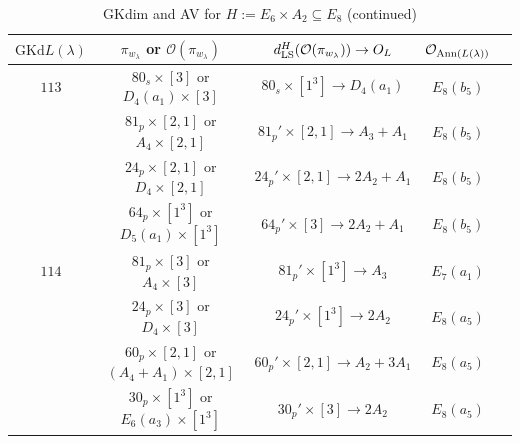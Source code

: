 \documentclass[reqno,12pt]{amsart}
\numberwithin{equation}{section}
\theoremstyle{plain}
\theoremstyle{definition}
\newcommand{\lam}{\lambda}
\renewcommand{\subset}{\subseteq}
\begin{document}
\begin{table}[htbp]\caption{GKdim and AV for $H:=E_6 \times A_2 \subset E_8$ (continued)}
	\label{tabe6a2-2}
	\centering
	\renewcommand{\arraystretch}{1.5}
	\setlength\tabcolsep{5pt}
	
	\begin{tabular}{|c|c|c|c|c|}
		\hline $\mathrm{GKd} L(\lambda)$&${\pi_{w_{\lam}}}$ or $\mathcal{O}(\pi_{w_{\lam}})$& $d_{\rm LS}^{H}(\mathcal{O}(\pi_{w_\lambda}))\rightarrow O_{L}$& $\mathcal{O}_{{\rm Ann}(L(\lambda))}$ \\ \hline
  
       
$ 113 $ 
         &  $80_s\times [3] $ or $D_4(a_1)\times [3]$ &  $80_s\times[1^3]\rightarrow D_4(a_1) $     &   $ E_8(b_5)$  \\
         &  $81_p\times [2,1] $ or $A_4\times [2,1]$ &  $81_{p}'\times[2,1]\rightarrow A_3+A_1 $     &   $ E_8(b_5)$ \\
        
         &  $24_p\times [2,1] $ or $D_4\times [2,1]$ &  $24_{p}'\times[2,1]\rightarrow 2A_2+A_1 $     &   $ E_8(b_5)$ \\
          &  $64_p\times [1^3] $ or $D_5(a_1)\times [1^3]$ &  $64_{p}'\times[3]\rightarrow 2A_2+A_1 $     &   $ E_8(b_5)$ \\
         \hline
$ 114 $  &  $81_p\times [3] $ or $A_4\times [3]$ &  $81_{p}'\times[1^3]\rightarrow A_3 $     &   $ E_7(a_1)$    \\  
         &  $24_p\times [3] $ or $D_4\times [3]$ &  $24_{p}'\times[1^3]\rightarrow 2A_2 $     &   $ E_8(a_5)$  \\
         &  $60_p\times [2,1] $ or $(A_4+A_1)\times [2,1]$ &  $60_{p}'\times[2,1]\rightarrow A_2+3A_1 $     &   $ E_8(a_5)$  \\
         &  $30_p\times [1^3] $ or $E_6(a_3)\times [1^3]$ &  $30_{p}'\times[3]\rightarrow 2A_2 $     &   $ E_8(a_5)$  \\
         \hline
        

\end{tabular}
\end{table}
\end{document}
